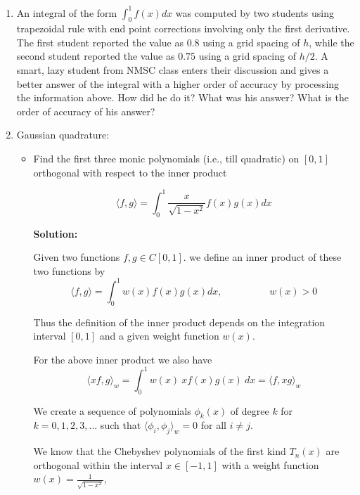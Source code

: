 \documentclass[a4paper,11pt]{report}
\begin{document}
\doublespacing
\begin{enumerate}

    \item An integral of the form $\displaystyle \int_{0}^{1} f(x) dx$ was computed
    by two students using trapezoidal rule with end point corrections involving only
    the first derivative. The first student reported the value as $0.8$ using a grid
    spacing of $h$, while the second student reported the value as $0.75$ using a grid
    spacing of $h/2$. A smart, lazy student from NMSC class enters their discussion
    and gives a better answer of the integral with a higher order of accuracy by processing
    the information above. How did he do it? What was his answer? What is the order of
    accuracy of his answer?

    \item Gaussian quadrature:
    \begin{itemize}
        \item Find the first three monic polynomials (i.e., till quadratic) on $[0, 1]$
        orthogonal with respect to the inner product

            \begin{equation*}
            \langle f, g \rangle = \int_{0}^{1} \frac{x}{\sqrt{1 - x^{2}}} f(x) g(x) dx
            \end{equation*}

    \textbf{Solution:}

    Given two functions $f, g \in C[0, 1]$. we define an inner product of these two functions by
    \begin{equation*}
    \langle f, g \rangle = \int_{0}^{1} w(x) f(x) g(x) dx, \hspace{2cm} w(x) > 0
    \end{equation*}
        
    Thus the definition of the inner product depends on the integration interval $[0, 1]$ and a given weight function $w(x)$.

    For the above inner product we also have
    \begin{equation*}
    \langle xf, g \rangle_{w} = \int_{0}^{1} w(x)\ x f(x) g(x)\ dx = \langle f, xg \rangle_{w}
    \end{equation*}

    We create a sequence of polynomials $\phi_{k}(x)$ of degree $k$ for $k = 0, 1, 2, 3, ...$ such that
    $\langle \phi_{i}, \phi_{j} \rangle_{w} = 0$ for all $i \neq j$.

    We know that the Chebyshev polynomials of the first kind $T_{n}(x)$ are orthogonal within the interval $x \in [-1, 1]$ with a weight function 
    $w(x) = \displaystyle \frac{1}{\sqrt{1 - x^{2}}}$,


\end{itemize}
\end{enumerate}
\end{document}
